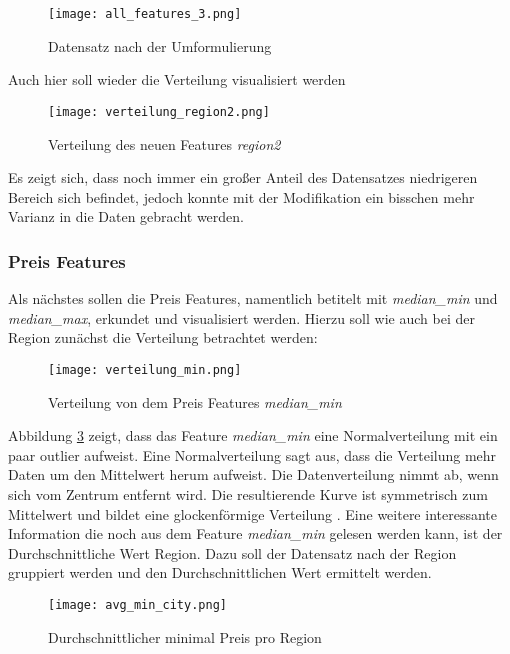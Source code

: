 \begin{figure}[h]
    \centering
    \texttt{[image: all\_features\_3.png]}
    \caption[Datensatz nach der Umformulierung]{Datensatz nach der Umformulierung}
    \label{img:all_features_3}
\end{figure}

Auch hier soll wieder die Verteilung visualisiert werden

\begin{figure}[h]
    \centering
    \texttt{[image: verteilung\_region2.png]}
    \caption[Verteilung des neuen Features \emph{region2}]{Verteilung des neuen Features \emph{region2}}
    \label{img:verteilung_region_2}
\end{figure}

Es zeigt sich, dass noch immer ein großer Anteil des Datensatzes niedrigeren Bereich sich befindet, jedoch konnte mit der Modifikation ein bisschen mehr Varianz in die Daten gebracht werden.

\subsubsection{Preis Features}
Als nächstes sollen die Preis Features, namentlich betitelt mit \emph{median\_min} und \emph{median\_max}, erkundet und visualisiert werden. Hierzu soll wie auch bei der Region zunächst die Verteilung betrachtet werden:
\newpage
\begin{figure}[h]
    \centering
    \texttt{[image: verteilung\_min.png]}
    \caption[Verteilung von dem Preis Features \emph{median\_min}]{Verteilung von dem Preis Features \emph{median\_min}}
    \label{img:verteilung_min}
\end{figure}

Abbildung \ref{img:verteilung_min} zeigt, dass das Feature \emph{median\_min} eine Normalverteilung mit ein paar outlier aufweist. Eine Normalverteilung  sagt aus, dass die Verteilung mehr Daten um den Mittelwert herum aufweist. Die Datenverteilung nimmt ab, wenn sich vom Zentrum entfernt wird. Die resultierende Kurve ist symmetrisch zum Mittelwert und bildet eine glockenförmige Verteilung \cite{Shrishty.05.08.2021}.
\newline
\newline
Eine weitere interessante Information die noch aus dem Feature \emph{median\_min} gelesen werden kann, ist der Durchschnittliche Wert Region. Dazu soll der Datensatz nach der Region gruppiert werden und den Durchschnittlichen Wert ermittelt werden.
\newpage
\begin{figure}[h]
    \centering
    \texttt{[image: avg\_min\_city.png]}
    \caption[Durchschnittlicher minimal Preis pro Region]{Durchschnittlicher minimal Preis pro Region}
    \label{img:avg_min_city}
\end{figure}

